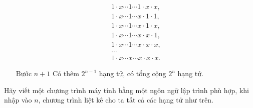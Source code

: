\documentclass[12pt]{article} %
\begin{document}
\begin{itemize}
\[\begin{matrix}
                1 \cdot x \cdots 1 \cdots 1 \cdot x \cdot x, \\
                1 \cdot x \cdots 1 \cdots x \cdot 1 \cdot 1, \\
                1 \cdot x \cdots 1 \cdots x \cdot 1 \cdot x, \\
                1 \cdot x \cdots 1 \cdots x \cdot x \cdot 1, \\
                1 \cdot x \cdots 1 \cdots x \cdot x \cdot x, \\
                \dots \\
                1 \cdot x \cdots x \cdots x \cdot x \cdot x.
            \end{matrix}\]
        \item [Bước \(n+1\)] Có thêm \(2^{n-1}\) hạng tử, có tổng cộng \(2^{n}\) hạng tử.
    \end{itemize} 
    Hãy viết một chương trình máy tính bằng một ngôn ngữ lập trình phù hợp, khi nhập vào \(n\), chương trình liệt kê cho ta tất cả các hạng tử như trên.
\end{document}
